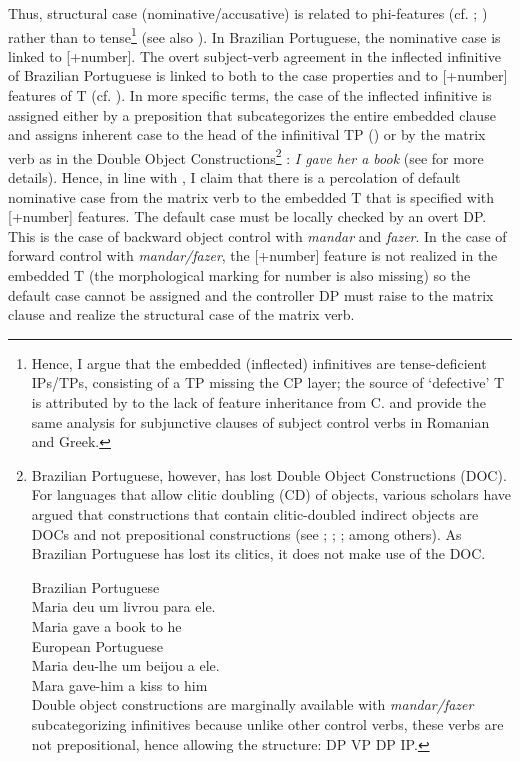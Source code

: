 \documentclass[output=paper]{langsci/langscibook}
\begin{document}
Thus, structural case (nominative\slash accusative) is related to phi-features (cf. \citealt{George1981}; \citealt{Sitaridou2006}) rather than to tense\footnote{Hence, I argue that the embedded (inflected) infinitives are tense-deficient IPs\slash TPs, consisting of a TP missing the CP layer; the source of ‘defective’ T is attributed by \citet{Chomsky2008} to the lack of feature inheritance from C. \citet{Alboiu2007} and \citet{Alexiadou2010} provide the same analysis for subjunctive clauses of subject control verbs in Romanian and Greek.} (see also \citealt{Pires2007}). In Brazilian Portuguese, the nominative case is linked to [+number]. The overt subject-verb agreement in the inflected infinitive of Brazilian Portuguese is linked to both to the case properties and to [+number] features of T (cf. \citealt{Nunes1998}). In more specific terms, the case of the inflected infinitive is assigned either by a preposition that subcategorizes the entire embedded clause and assigns inherent case to the head of the infinitival TP (\citealt{Hornstein2008}) or by the matrix verb as in the Double Object Constructions\footnote{Brazilian Portuguese, however, has lost Double Object Constructions (DOC). For languages that allow clitic doubling (CD) of objects, various scholars have argued that constructions that contain clitic-doubled indirect objects are DOCs and not prepositional constructions (see \citealt{Demonte1995}; \citealt{Bleam1999}; \citealt{Anagnostopoulou2003}; among others). As Brazilian Portuguese has lost its clitics, it does not make use of the DOC. 

\ea Brazilian Portuguese\\
    \gll Maria deu   um livrou para ele.   \\
        Maria gave a     book  to      he\\
\z
\ea European Portuguese \\
    \gll Maria deu-lhe   um beijou a  ele. \\  
            Mara  gave-him a    kiss    to him\\
\z
Double object constructions are marginally available with \textit{mandar\slash fazer} subcategorizing infinitives because unlike other control verbs, these verbs are not prepositional, hence allowing the structure: DP VP DP IP.} : \textit{I gave her a book} (see \citealt{Larson1991} for more details). Hence, in line with \citet{Raposo1987}, I claim that there is a percolation of default nominative case from the matrix verb to the embedded T that is specified with [+number] features. The default case must be locally checked by an overt DP. This is the case of backward object control with \textit{mandar} and \textit{fazer}. In the case of forward control with \textit{mandar\slash fazer}, the [+number] feature is not realized in the embedded T (the morphological marking for number is also missing) so the default case cannot be assigned and the controller DP must raise to the matrix clause and realize the structural case of the matrix verb.
\end{document}
